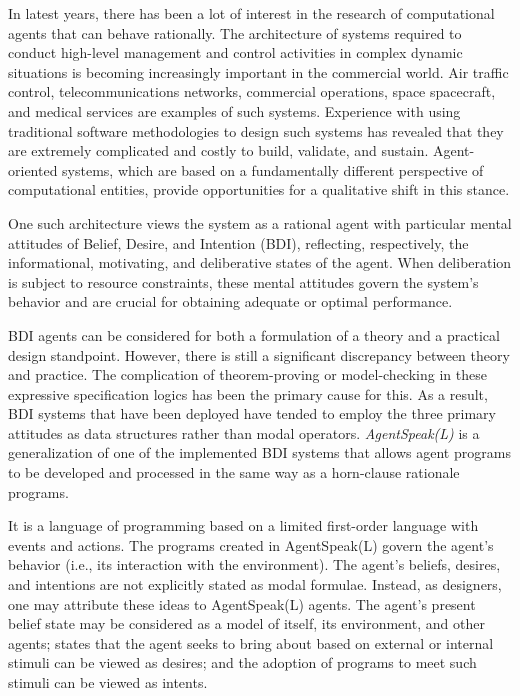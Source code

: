 \vspace{.5cm}

In latest years, there has been a lot of interest in the research of computational agents that can behave rationally. The architecture of systems required to conduct high-level management and control activities in complex dynamic situations is becoming increasingly important in the commercial world. Air traffic control, telecommunications networks, commercial operations, space spacecraft, and medical services are examples of such systems. Experience with using traditional software methodologies to design such systems has revealed that they are extremely complicated and costly to build, validate, and sustain. Agent-oriented systems, which are based on a fundamentally different perspective of computational entities, provide opportunities for a qualitative shift in this stance. 

\vspace{.5cm}

One such architecture views the system as a rational agent with particular mental attitudes of Belief, Desire, and Intention (\ac{BDI}), reflecting, respectively, the informational, motivating, and deliberative states of the agent. When deliberation is subject to resource constraints, these mental attitudes govern the system's behavior and are crucial for obtaining adequate or optimal performance.

\vspace{.5cm}

\ac{BDI} agents can be considered for both a formulation of a theory and a practical design standpoint. However, there is still a significant discrepancy between theory and practice. The complication of theorem-proving or model-checking in these expressive specification logics has been the primary cause for this. As a result, \ac{BDI} systems that have been deployed have tended to employ the three primary attitudes as data structures rather than modal operators. \textit{AgentSpeak(L)} is a generalization of one of the implemented \ac{BDI} systems that allows agent programs to be developed and processed in the same way as a horn-clause rationale programs.

\vspace{.5cm}

It is a language of programming based on a limited first-order language with events and actions. The programs created in AgentSpeak(L) govern the agent's behavior (i.e., its interaction with the environment). The agent's beliefs, desires, and intentions are not explicitly stated as modal formulae. Instead, as designers, one may attribute these ideas to AgentSpeak(L) agents. The agent's present belief state may be considered as a model of itself, its environment, and other agents; states that the agent seeks to bring about based on external or internal stimuli can be viewed as desires; and the adoption of programs to meet such stimuli can be viewed as intents.

